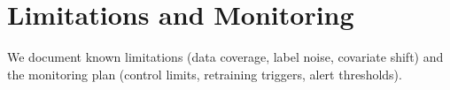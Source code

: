 
\section{Limitations and Monitoring}
We document known limitations (data coverage, label noise, covariate shift) and the monitoring plan (control limits, retraining triggers, alert thresholds).
